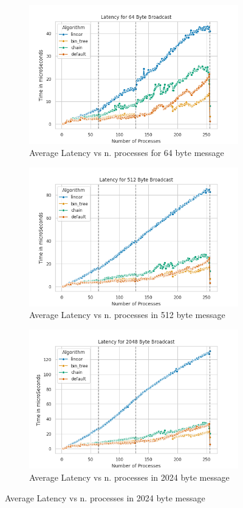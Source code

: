 \documentclass{article}
\begin{document}
	\begin{figure}[h]
		\centering
		\begin{subfigure}{0.45\textwidth}
			\centering
			\includegraphics[width=0.7\linewidth]{../exercise1/plots/bcast_all_64byte}
			\caption{Average Latency vs n. processes for 64 byte message}
			\label{fig:bcastall64byte}
		\end{subfigure}
		\begin{subfigure}{0.45\textwidth}
			\centering
			\includegraphics[width=0.7\linewidth]{../exercise1/plots/bcast_all_512byte}
			\caption{Average Latency vs n. processes in 512 byte message}
			\label{fig:bcastall512byte}
		\end{subfigure}
		\begin{subfigure}{0.45\textwidth}
			\centering
			\includegraphics[width=0.7\linewidth]{../exercise1/plots/bcast_all_2048byte}
			\caption{Average Latency vs n. processes in 2024 byte message}
			\label{fig:bcastall2048byte}
		\end{subfigure}
	\end{figure}
	
\end{document}
